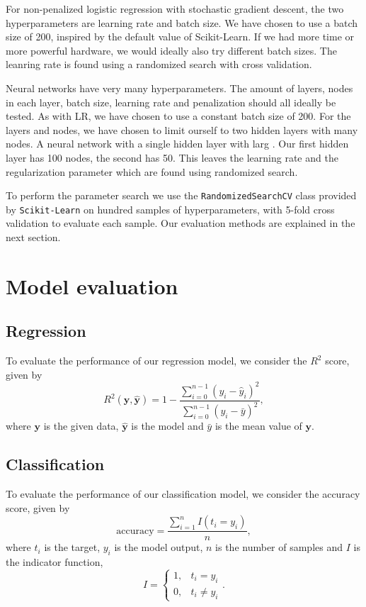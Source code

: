 \documentclass[a4paper, 11pt, twocolumn]{article}
\begin{document}
For non-penalized logistic regression with stochastic gradient descent,
the two hyperparameters are learning rate and batch size. We have chosen to use
a batch size of 200, inspired by the default value of Scikit-Learn. If we had
more time or more powerful hardware, we would ideally also try different batch sizes.
The leanring rate is found using a randomized search with cross validation.

Neural networks have very many hyperparameters. The amount of layers, nodes in each
layer, batch size, learning rate and penalization should all ideally be tested.
As with LR, we have chosen to use a constant batch size of 200. For the layers
and nodes, we have chosen to limit ourself to two hidden layers with many nodes.
A neural network with a single hidden layer with larg \cite{ML_algo}. Our first hidden
layer has 100 nodes, the second has 50. This leaves the learning rate and
the regularization parameter which are found using randomized search.

To perform the parameter search we use the \texttt{RandomizedSearchCV} class provided
by \texttt{Scikit-Learn} \cite{sklearn_api} on hundred samples of hyperparameters,
with 5-fold cross validation to evaluate each sample. Our evaluation methods are
explained in the next section.

\section{Model evaluation}
\subsection{Regression}
To evaluate the performance of our regression model, we consider the $R^2$ score,
given by
\begin{equation}
	R^2(\bm{y}, \bm{\hat{y}}) = 1 - \frac{\sum_{i=0}^{n - 1} (y_i -
	\hat{y}_i)^2}{\sum_{i=0}^{n - 1} (y_i - \bar{y})^2},
    \label{eq:R2}
\end{equation}
where $\bm{y}$ is the given data, $\bm{\hat{y}}$ is the model and ${\bar{y}}$ is
the mean value of $\bm{y}$.
\subsection{Classification}
\label{Classification}
To evaluate the performance of our classification model, we consider the accuracy
score, given by
\begin{equation}
\label{eq:accuracy}
\text{accuracy}=\frac{\sum_{i=1}^nI(t_i=y_i)}{n},
\end{equation}
where $t_i$ is the target, $y_i$ is the model output, $n$ is the number of
samples and $I$ is the indicator function,
\[
I = \begin{cases}
1, & t_i = y_i\\
0, & t_i \neq y_i
\end{cases} .
\]
\end{document}

